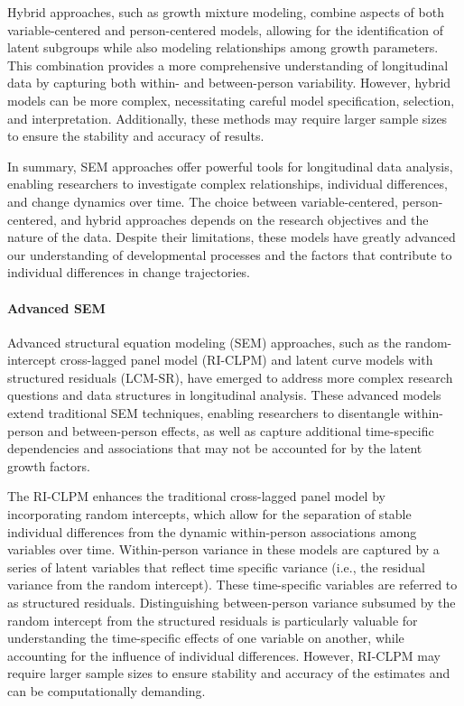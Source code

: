 \documentclass[
  number,
  preprint,
  3p,
  twocolumn]{elsarticle}
\let\oldparagraph\paragraph
\renewcommand{\paragraph}[1]{\oldparagraph{#1}\mbox{}}
\begin{document}
Hybrid approaches, such as growth mixture modeling, combine aspects of
both variable-centered and person-centered models, allowing for the
identification of latent subgroups while also modeling relationships
among growth parameters. This combination provides a more comprehensive
understanding of longitudinal data by capturing both within- and
between-person variability. However, hybrid models can be more complex,
necessitating careful model specification, selection, and
interpretation. Additionally, these methods may require larger sample
sizes to ensure the stability and accuracy of results.

In summary, SEM approaches offer powerful tools for longitudinal data
analysis, enabling researchers to investigate complex relationships,
individual differences, and change dynamics over time. The choice
between variable-centered, person-centered, and hybrid approaches
depends on the research objectives and the nature of the data. Despite
their limitations, these models have greatly advanced our understanding
of developmental processes and the factors that contribute to individual
differences in change trajectories.

\hypertarget{advanced-sem}{%
\paragraph{Advanced SEM}\label{advanced-sem}}

Advanced structural equation modeling (SEM) approaches, such as the
random-intercept cross-lagged panel model (RI-CLPM) and latent curve
models with structured residuals (LCM-SR), have emerged to address more
complex research questions and data structures in longitudinal analysis.
These advanced models extend traditional SEM techniques, enabling
researchers to disentangle within-person and between-person effects, as
well as capture additional time-specific dependencies and associations
that may not be accounted for by the latent growth factors.

The RI-CLPM enhances the traditional cross-lagged panel model by
incorporating random intercepts, which allow for the separation of
stable individual differences from the dynamic within-person
associations among variables over time. Within-person variance in these
models are captured by a series of latent variables that reflect time
specific variance (i.e., the residual variance from the random
intercept). These time-specific variables are referred to as structured
residuals. Distinguishing between-person variance subsumed by the random
intercept from the structured residuals is particularly valuable for
understanding the time-specific effects of one variable on another,
while accounting for the influence of individual differences. However,
RI-CLPM may require larger sample sizes to ensure stability and accuracy
of the estimates and can be computationally demanding.
\end{document}
